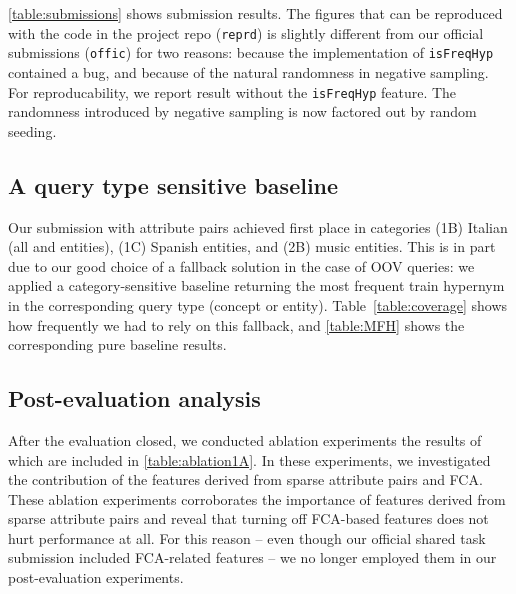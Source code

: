 \documentclass[11pt,a4paper]{article}
\begin{document}
\autoref{table:submissions} shows submission results.
The figures that can be reproduced with the code in the project repo
(\texttt{reprd}) is slightly different from our official submissions
(\texttt{offic}) for two reasons:
because the implementation of \texttt{isFreqHyp} contained a bug, and because
of the natural randomness in negative sampling.
For reproducability, we report result without the \texttt{isFreqHyp} feature.
The randomness introduced by negative sampling is now factored out by random
seeding.






\subsection{A query type sensitive baseline}

Our submission with attribute pairs achieved first place in 
categories
  {(1B) Italian} ({all} and {entities}),
  {(1C) Spanish entities}, and
  {(2B) music entities}.
This is in part due to our good choice of a fallback solution
in the case of OOV queries: we applied a category-sensitive baseline returning
the most frequent train hypernym in the corresponding query type (concept or
entity).  Table~\ref{table:coverage} shows how frequently we had to rely on
this fallback, and \autoref{table:MFH} shows the corresponding pure baseline
results.



\subsection{Post-evaluation analysis}





After the evaluation closed, we conducted ablation experiments the results of 
which are included in
\autoref{table:ablation1A}. In these experiments, we investigated the 
contribution of the features derived from sparse attribute pairs and FCA.
These ablation experiments corroborates the importance of features derived 
from sparse attribute pairs and reveal that turning off FCA-based features 
does not hurt performance at all. For this reason -- even though our official 
shared task submission included FCA-related features -- we no longer employed 
them in our post-evaluation experiments.
\end{document}

